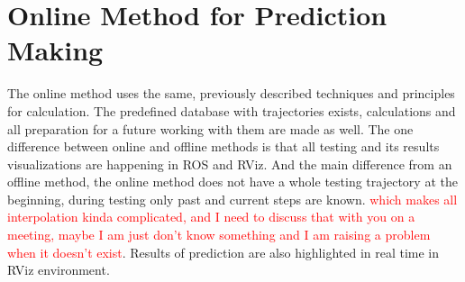 \section{Online Method for Prediction Making}

The online method uses the same, previously described techniques and principles for calculation. The predefined database with trajectories exists, calculations and all preparation for a future working with them are made as well. The one difference between online and offline methods is that all testing and its results visualizations are happening in \gls{ROS} and \gls{RViz}. And the main difference from an offline method, the online method does not have a whole testing trajectory at the beginning, during testing only past and current steps are known. \textcolor{red}{which makes all interpolation kinda complicated, and I need to discuss that with you on a meeting, maybe I am just don't know something and I am raising a problem when it doesn't exist}. Results of prediction are also highlighted in real time in \gls{RViz} environment.
